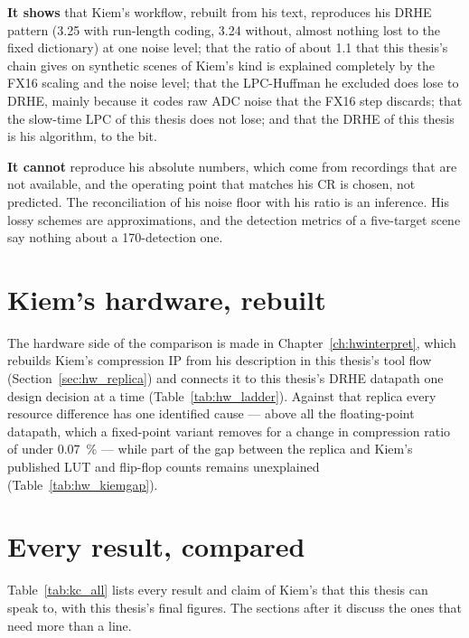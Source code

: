 \begin{keybox}
\textbf{It shows} that Kiem's workflow, rebuilt from his text, reproduces his
DRHE pattern (3.25 with run-length coding, 3.24 without, almost nothing lost to
the fixed dictionary) at one noise level; that the ratio of about 1.1 that this
thesis's chain gives on synthetic scenes of Kiem's kind is explained completely
by the FX16 scaling and the noise level; that the LPC-Huffman he excluded does lose to
DRHE, mainly because it codes raw ADC noise that the FX16 step discards; that
the slow-time LPC of this thesis does not lose; and that the DRHE of this
thesis is his algorithm, to the bit.

\textbf{It cannot} reproduce his absolute numbers, which come from recordings
that are not available, and the operating point that matches his CR is chosen,
not predicted. The reconciliation of his noise floor with his ratio is an
inference. His lossy schemes are approximations, and the detection metrics of
a five-target scene say nothing about a 170-detection one.
\end{keybox}

\section{Kiem's hardware, rebuilt}
\label{sec:kc_replica}

The hardware side of the comparison is made in Chapter~\ref{ch:hwinterpret},
which rebuilds Kiem's compression IP from his description in this thesis's tool
flow (Section~\ref{sec:hw_replica}) and connects it to this thesis's DRHE
datapath one design decision at a time (Table~\ref{tab:hw_ladder}). Against
that replica every resource difference has one identified cause --- above all
the floating-point datapath, which a fixed-point variant removes for a change in
compression ratio of under \SI{0.07}{\percent} --- while part of the gap between
the replica and Kiem's published LUT and flip-flop counts remains unexplained
(Table~\ref{tab:hw_kiemgap}).


\section{Every result, compared}
\label{sec:kc_table}

Table~\ref{tab:kc_all} lists every result and claim of Kiem's that this thesis
can speak to, with this thesis's final figures. The sections after it discuss
the ones that need more than a line.

